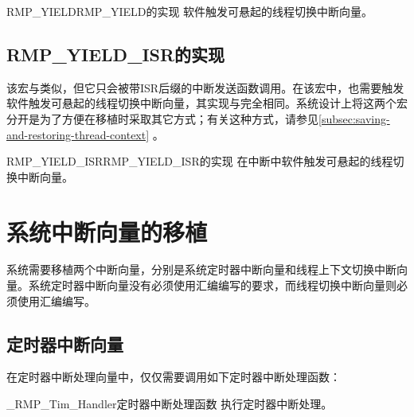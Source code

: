 \begin{apidesc}{RMP\_YIELD}{RMP\_YIELD的实现}
    软件触发可悬起的线程切换中断向量。
    \begin{apiparams}
    \end{apiparams}
    \begin{apiret}
    \end{apiret}
\end{apidesc}

\subsection{RMP\_YIELD\_ISR的实现}\label{subsec:implementation-of-rmp-yield-isr}

该宏与类似，但它只会被带ISR后缀的中断发送函数调用。在该宏中，也需要触发软件触发可悬起的线程切换中断向量，其实现与完全相同。系统设计上将这两个宏分开是为了方便在移植时采取其它方式；有关这种方式，请参见\ref{subsec:saving-and-restoring-thread-context}
。

\begin{apidesc}{RMP\_YIELD\_ISR}{RMP\_YIELD\_ISR的实现}
    在中断中软件触发可悬起的线程切换中断向量。
    \begin{apiparams}
    \end{apiparams}
    \begin{apiret}
    \end{apiret}
\end{apidesc}

\section{系统中断向量的移植}\label{sec:porting-the-system-interrupt-vectors}

系统需要移植两个中断向量，分别是系统定时器中断向量和线程上下文切换中断向量。系统定时器中断向量没有必须使用汇编编写的要求，而线程切换中断向量则必须使用汇编编写。

\subsection{定时器中断向量}\label{subsec:system-tick-vector}

在定时器中断处理向量中，仅仅需要调用如下定时器中断处理函数：

\begin{apidesc}{\_RMP\_Tim\_Handler}{定时器中断处理函数}
    执行定时器中断处理。
    \begin{apiparams}
    \end{apiparams}
    \begin{apiret}
    \end{apiret}
\end{apidesc}

